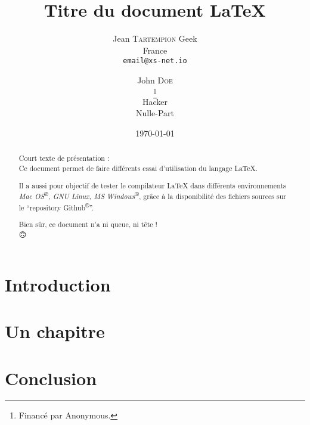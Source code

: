\documentclass[frenchb, 12pt, twoside, a4paper]{article}
\title{Titre du document \LaTeX{}}
\author{
  Jean \textsc{Tartempion}
  Geek \\
  France \\
  \texttt{email@xs-net.io} \\           %
  \and
  John \textsc{Doe} \\
  \thanks{Financé par Anonymous.} \\    %
  Hacker \\
  Nulle-Part
  }
\date{\today}                           %
\begin{document}
\maketitle                              %

{
\renewcommand{\contentsname}{Sommaire}  %
\tableofcontents                        %
}


\begin{abstract}
  Court texte de présentation : \\
  Ce document permet de faire différents essai d'utilisation
  du langage \LaTeX{}.
  
  Il a aussi pour objectif de tester le compilateur \LaTeX{}
  dans différents environnements 
  \emph{Mac OS\textsuperscript{®}, GNU Linux, MS Windows\textsuperscript{®}},
  grâce à la disponibilité des fichiers sources sur le 
  \enquote{repository Github\textsuperscript{®}}.
  
  Bien sûr, ce document n'a ni queue, ni tête ! \\
  \Large{🙃}
\end{abstract}



\section*{Introduction}



\section{Un chapitre}


\begin{comment}
\subsection{Un sous-chapitre}
…
\paragraph{Sous-partie de sous-chapitre}
…

\subsection{Autre sous-chapitre}
…
\end{comment}

\section*{Conclusion}


\end{document}
